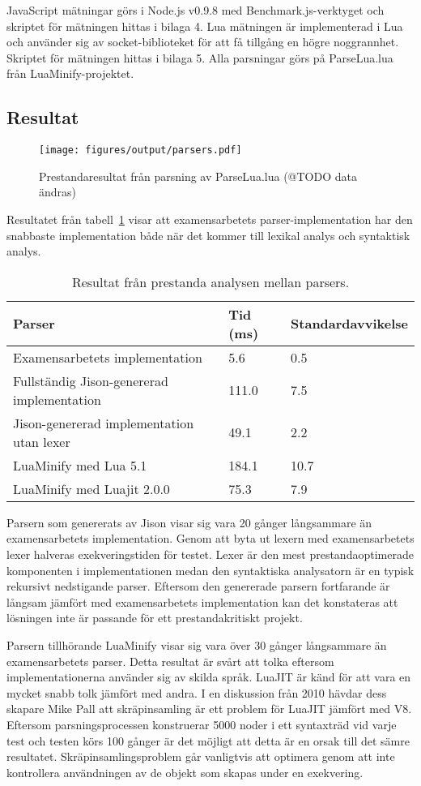 JavaScript mätningar görs i Node.js v0.9.8 med Benchmark.js-verktyget och skriptet
för mätningen hittas i bilaga 4. Lua mätningen är implementerad i Lua och
använder sig av socket-biblioteket för att få tillgång en högre noggrannhet.
Skriptet för mätningen hittas i bilaga 5. Alla parsningar görs på ParseLua.lua
från LuaMinify-projektet.

\subsection{Resultat}

\begin{figure}[ht]
  \texttt{[image: figures/output/parsers.pdf]}
  \caption{Prestandaresultat från parsning av ParseLua.lua (@TODO data ändras)}
\end{figure}

Resultatet från tabell~\ref{tab:parsers} visar att examensarbetets
parser-implementation har den snabbaste implementation både när det kommer
till lexikal analys och syntaktisk analys.

\begin{table}[ht]
  \caption{Resultat från prestanda analysen mellan parsers.}
  \begin{tabular}{l l l}
    Parser & Tid (ms) & Standardavvikelse \\
    \hline
    Examensarbetets implementation & 5.6 & 0.5 \\
    Fullständig Jison-genererad implementation & 111.0 & 7.5 \\
    Jison-genererad implementation utan lexer & 49.1 & 2.2 \\
    LuaMinify med Lua 5.1 & 184.1 & 10.7 \\
    LuaMinify med Luajit 2.0.0 & 75.3 & 7.9
  \end{tabular}
  \label{tab:parsers}
\end{table}


Parsern som genererats av Jison visar sig vara 20 gånger långsammare än
examensarbetets implementation.  Genom att byta ut lexern med examensarbetets
lexer halveras exekveringstiden för testet. Lexer är den mest
prestandaoptimerade komponenten i implementationen medan den syntaktiska
analysatorn är en typisk rekursivt nedstigande parser. Eftersom den
genererade parsern fortfarande är långsam jämfört med examensarbetets
implementation kan det konstateras att lösningen inte är passande för ett
prestandakritiskt projekt.

Parsern tillhörande LuaMinify visar sig vara över 30 gånger långsammare än
examensarbetets parser. Detta resultat är svårt att tolka eftersom
implementationerna använder sig av skilda språk. LuaJIT är känd för att vara
en mycket snabb tolk jämfört med andra. I en diskussion från 2010 hävdar dess
skapare Mike Pall \citep{mp10} att skräpinsamling är ett problem för LuaJIT
jämfört med V8. Eftersom parsningsprocessen konstruerar 5000 noder i ett
syntaxträd vid varje test och testen körs 100 gånger är det möjligt att detta
är en orsak till det sämre resultatet. Skräpinsamlingsproblem går vanligtvis
att optimera genom att inte kontrollera användningen av de objekt som skapas
under en exekvering.

